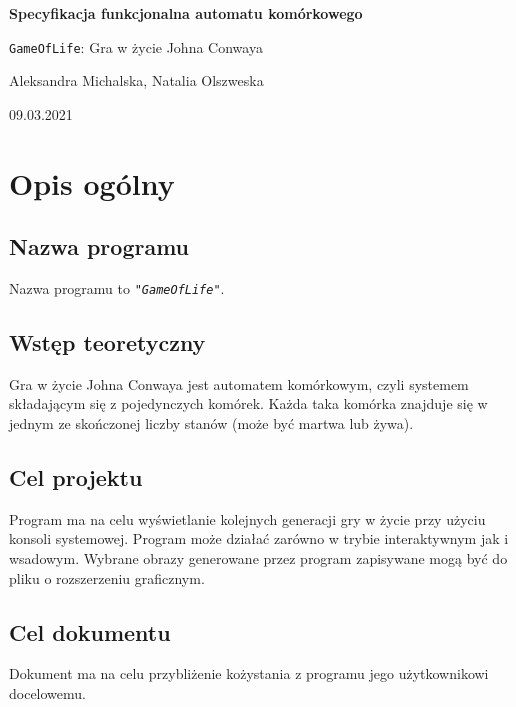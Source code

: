 \documentclass[a4paper]{article}
\begin{document}
\begin{titlepage}
	\begin{center}
		\vspace*{5cm}

	        \Huge
        	\textbf{Specyfikacja funkcjonalna automatu kom\'orkowego}

        	\vspace{1cm}
	        \Huge
        	\texttt{GameOfLife}: Gra w \.zycie Johna Conwaya

    		\vspace{1.5cm}

	        \large
		Aleksandra Michalska, Natalia Olszweska

        	\vfill

	        \vspace{3cm}

		\large 09.03.2021
	\end{center}
\end{titlepage}

\tableofcontents
\newpage


\section{Opis og\'olny}
\subsection{Nazwa programu}
\quad Nazwa programu to \texttt{\textit{"GameOfLife"}}.
\subsection{Wst\k{e}p teoretyczny}
\quad Gra w \.zycie Johna Conwaya jest automatem kom\'orkowym, czyli systemem sk\l{}adaj\k{a}cym si\k{e} z pojedynczych kom\'orek. Ka\.zda taka kom\'orka znajduje si\k{e} w jednym ze sko\'nczonej liczby stan\'ow (mo\.ze by\'c martwa lub \.zywa). 
\subsection{Cel projektu}
\quad Program ma na celu wy\'swietlanie kolejnych generacji gry w \.zycie przy u\.zyciu konsoli systemowej. Program mo\.ze dzia\l{}a\'c zar\'owno w trybie interaktywnym jak i wsadowym. Wybrane obrazy generowane przez program zapisywane mog\k{a} by\'c do pliku o rozszerzeniu graficznym.
\subsection{Cel dokumentu}
\quad Dokument ma na celu przybli\.zenie ko\.zystania z programu jego u\.zytkownikowi docelowemu.
\end{document}
